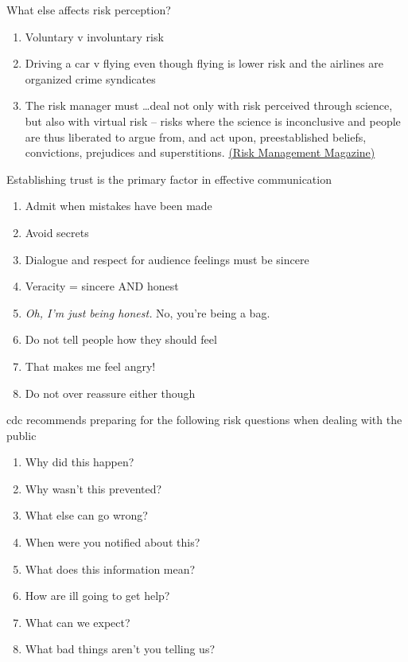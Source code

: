\documentclass[aspectratio=1610,pdftex,dvipsnames,compress,xcolor={dvipsnames}]{beamer}
\newcommand{\acs}{\acrshort} %
\begin{document}
\begin{frame}{What else affects risk perception?}
    \begin{enumerate}[series=outerlist,topsep=0pt,itemsep=21pt,leftmargin=*,label=(\arabic*)]
        \item[]Voluntary v involuntary risk
        \item[]Driving a car v flying even though flying is lower risk and the airlines are organized crime syndicates
        \item[]The risk manager must \ldots deal not only with risk perceived through science, but also with virtual risk -- risks where the science is inconclusive and people are thus liberated to argue from, and act upon, preestablished beliefs, convictions, prejudices and superstitions. \href{https://www.proquest.com/docview/227006505/fulltextPDF/2985AF92A8EE48CFPQ/1?accountid=14551&sourcetype=Magazines}{(Risk Management Magazine)}
    \end{enumerate}
\end{frame}


\begin{frame}{Establishing trust is the primary factor in effective communication}
    \begin{enumerate}[series=outerlist,topsep=0pt,itemsep=17pt,leftmargin=*,label=(\arabic*)]
        \item[]Admit when mistakes have been made  
        \item[]Avoid secrets
        \item[]Dialogue and respect for audience feelings must be sincere
        \item[]Veracity = sincere AND honest
        \item[]\textit{Oh, I'm just being honest.} No, you're being a bag.
        \item[]Do not tell people how they should feel  
        \item[]That makes me feel angry!
        \item[]Do not over reassure either though
    \end{enumerate}
\end{frame}


\begin{frame}{\acs{cdc} recommends preparing for the following risk questions when dealing with the public}
    \begin{enumerate}[series=outerlist,topsep=0pt,itemsep=15pt,leftmargin=*,label=(\arabic*)]
        \item[]Why did this happen?
        \item[]Why wasn't this prevented?
        \item[]What else can go wrong?
        \item[]When were you notified about this?
        \item[]What does this information mean?
        \item[]How are ill going to get help?
        \item[]What can we expect?
        \item[]What bad things aren't you telling us?
    \end{enumerate}
\end{frame}
\end{document}
